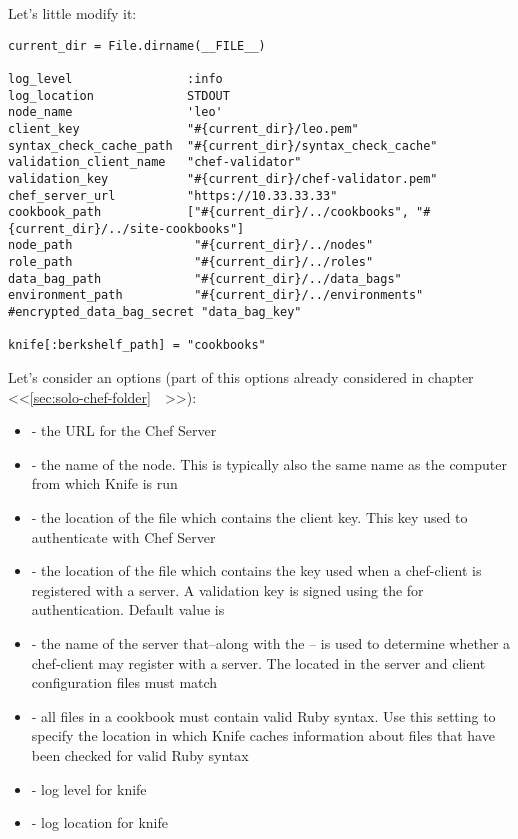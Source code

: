 Let's little modify it:

\begin{lstlisting}[label=lst:my-server-cloud-knife4,title=my-server-cloud/.chef/knife.rb]
current_dir = File.dirname(__FILE__)

log_level                :info
log_location             STDOUT
node_name                'leo'
client_key               "#{current_dir}/leo.pem"
syntax_check_cache_path  "#{current_dir}/syntax_check_cache"
validation_client_name   "chef-validator"
validation_key           "#{current_dir}/chef-validator.pem"
chef_server_url          "https://10.33.33.33"
cookbook_path            ["#{current_dir}/../cookbooks", "#{current_dir}/../site-cookbooks"]
node_path                 "#{current_dir}/../nodes"
role_path                 "#{current_dir}/../roles"
data_bag_path             "#{current_dir}/../data_bags"
environment_path          "#{current_dir}/../environments"
#encrypted_data_bag_secret "data_bag_key"

knife[:berkshelf_path] = "cookbooks"
\end{lstlisting}

Let's consider an options (part of this options already considered in chapter <<\ref{sec:solo-chef-folder}~~>>):

\begin{itemize}
  \item {} - the URL for the Chef Server
  \item {} - the name of the node. This is typically also the same name as the computer from which Knife is run
  \item {} - the location of the file which contains the client key. This key used to authenticate with Chef Server
  \item {} - the location of the file which contains the key used when a chef-client is registered with a server. A validation key is signed using the  for authentication. Default value is 
  \item {} - the name of the server that–along with the  – is used to determine whether a chef-client may register with a server. The  located in the server and client configuration files must match
  \item {} - all files in a cookbook must contain valid Ruby syntax. Use this setting to specify the location in which Knife caches information about files that have been checked for valid Ruby syntax
  \item {} - log level for knife
  \item {} - log location for knife
\end{itemize}

